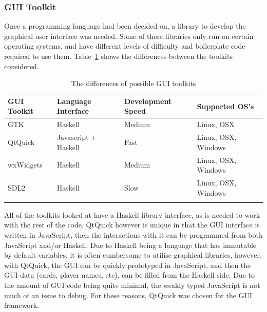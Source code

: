 \subsubsection{GUI Toolkit}

Once a programming language had been decided on, a library to develop the
graphical user interface was needed. Some of these libraries only run on
certain operating systems, and have different levels of difficulty and
boilerplate code required to use them. Table~\ref{table:toolkits} shows the
differences between the toolkits considered.

\begin{table}[H]
    \begin{adjustbox}{center}
    \begin{tabular}{l l l l}
    \toprule
    GUI Toolkit & Language Interface    & Development Speed & Supported OS's        \\
    \midrule
    GTK         & Haskell               & Medium            & Linux, OSX            \\ \addlinespace
    QtQuick     & Javascript + Haskell  & Fast              & Linux, OSX, Windows   \\ \addlinespace
    wxWidgets   & Haskell               & Medium            & Linux, OSX, Windows   \\ \addlinespace
    SDL2        & Haskell               & Slow              & Linux, OSX, Windows   \\ \addlinespace
    \bottomrule
    \end{tabular}
    \end{adjustbox}
    \caption{The differences of possible GUI toolkits}
    \label{table:toolkits}
\end{table}

All of the toolkits looked at have a Haskell library interface, as is needed
to work with the rest of the code. QtQuick however is unique in that the GUI
interface is written in JavaScript, then the interactions with it can be
programmed from both JavaScript and/or Haskell. Due to Haskell being a language
that has immutable by default variables, it is often cumbersome to utilise
graphical libraries, however, with QtQuick, the GUI can be quickly prototyped
in JavaScript, and then the GUI data (cards, player names, etc), can be filled
from the Haskell side. Due to the amount of GUI code being quite minimal, the
weakly typed JavaScript is not much of an issue to debug. For these reasons,
QtQuick was chosen for the GUI framework.

